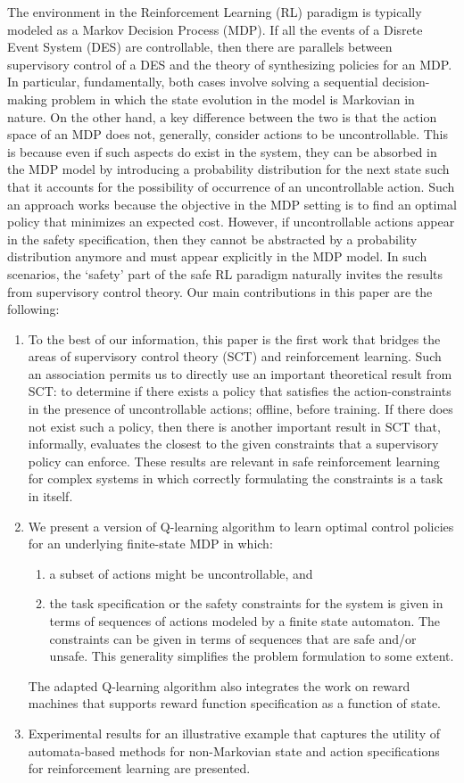 \documentclass[letterpaper, 10 pt, conference]{ieeeconf}
\begin{document}
The environment in the Reinforcement Learning (RL) paradigm is typically modeled as a Markov Decision Process (MDP). If all the events of a Disrete Event System (DES) are controllable, then there are parallels between supervisory control of a DES and the theory of synthesizing policies for an MDP. In particular, fundamentally, both cases involve solving a sequential decision-making problem in which the state evolution in the model is Markovian in nature. On the other hand, a key difference between the two is that the action space of an MDP does not, generally, consider actions to be uncontrollable. This is because even if such aspects do exist in the system, they can be absorbed in the MDP model by introducing a probability distribution for the next state such that it accounts for the possibility of occurrence of an uncontrollable action. Such an approach works because the objective in the MDP setting is to find an optimal policy that minimizes an expected cost. However, if uncontrollable actions appear in the safety specification, then they cannot be abstracted by a probability distribution anymore and must appear explicitly in the MDP model. In such scenarios, the `safety' part of the safe RL paradigm naturally invites the results from supervisory control theory. Our main contributions in this paper are the following:
\begin{enumerate}
    \item To the best of our information, this paper is the first work that bridges the areas of supervisory control theory (SCT) and reinforcement learning. Such an association permits us to directly use an important theoretical result from SCT: to determine if there exists a policy that satisfies the action-constraints in the presence of uncontrollable actions; offline, before training. If there does not exist such a policy, then there is another important result in SCT that, informally, evaluates the closest to the given constraints that a supervisory policy can enforce. These results are relevant in safe reinforcement learning for complex systems in which correctly formulating the constraints is a task in itself.  
    \item We present a version of Q-learning algorithm to learn optimal control policies for an underlying finite-state MDP in which:
    \begin{enumerate}
        \item a subset of actions might be uncontrollable, and
        \item the task specification or the safety constraints for the system is given in terms of sequences of actions modeled by a finite state automaton. The constraints can be given in terms of sequences that are safe and/or unsafe. This generality simplifies the problem formulation to some extent. 
    \end{enumerate}
    The adapted Q-learning algorithm also integrates the work on reward machines\cite{icarte2018using} that supports reward function specification as a function of state.
    \item Experimental results for an illustrative example that captures the utility of automata-based methods for non-Markovian state and action specifications for reinforcement learning are presented.
\end{enumerate}
\end{document}
